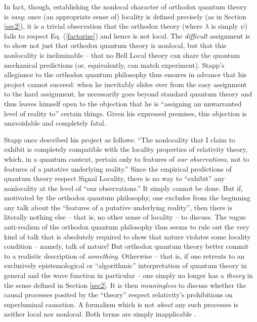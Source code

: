 \documentclass[aps,prc,onecolumn,12pt]{revtex4-2}
\begin{document}
In fact, though, establishing the nonlocal character of
orthodox quantum theory is \emph{easy}:  once (an appropriate
sense of) locality is defined precisely (as in Section \ref{sec2}),
it is a trivial observation that the
orthodox theory (where $\lambda$ is simply $\psi$)
fails to respect Eq. (\ref{factorize}) and
hence is not local.  The \emph{difficult} assignment is to
show not just that orthodox quantum theory is nonlocal, but that this
nonlocality is ineliminable -- that no Bell Local theory can share the
quantum mechanical predictions (or, equivalently, can match experiment).
Stapp's allegiance to the orthodox quantum philosophy thus ensures in
advance that his project cannot succeed: when he inevitably slides over
from the easy assignment to the hard assignment, he necessarily goes
beyond standard quantum theory and thus leaves himself open to the
objection that he is ``assigning an unwarranted level of reality to''
certain things.  Given his expressed premises, this objection is
unavoidable and completely fatal.

Stapp once described his project as follows:
``The nonlocality that I claim to exhibit is
completely compatible with the locality properties of relativity
theory, which, in a quantum context, pertain only to features of
\emph{our observations}, not to features of a putative underlying
reality.'' \cite{stappresponse}
Since the empirical predictions of quantum
theory respect Signal Locality, there is no way to ``exhibit''
any nonlocality at the level of ``our observations.''  It simply
cannot be done.  But if, motivated by the orthodox quantum philosophy,
one excludes from the beginning any talk about the ``features of a
putative underlying reality'', then there is literally nothing else --
that is, no other sense of locality -- to discuss.
The vague anti-realism of
the orthodox quantum philosophy thus seems to rule out the
very kind of talk that is absolutely required to show that nature
violates some locality condition -- namely, talk of nature!
But orthodox quantum theory better commit to a realistic
description of \emph{something}.  Otherwise -- that is, if one retreats
to an exclusively epistemological or ``algorithmic''
interpretation of quantum theory in
general and the wave function in particular -- one simply no longer
has a \emph{theory} in the sense defined in Section \ref{sec2}.  It
is then \emph{meaningless} to discuss whether the causal
processes posited by the ``theory'' respect relativity's prohibitions
on superluminal causation.  A formalism which is not \emph{about} any
such processes
is neither local nor nonlocal.  Both terms are simply inapplicable \cite{boxes}.
\end{document}
